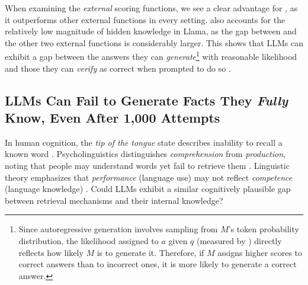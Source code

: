 When examining the \textit{external} scoring functions, we see a clear advantage for \baselineC, as it outperforms other external functions in every setting. \baselineC also accounts for the relatively low magnitude of hidden knowledge in \textsf{Llama}, as the gap between \baselineD and the other two external functions is considerably larger. 
This shows that LLMs can exhibit a gap between the answers they can \emph{generate}\footnote{\label{footnote:generation} Since autoregressive generation involves sampling from $M$'s token probability distribution, the likelihood assigned to $a$ given $q$ (measured by \baselineA) directly reflects how likely $M$ is to generate it. Therefore, if $M$ assigns higher \baselineA scores to correct answers than to incorrect ones, it is more likely to generate a correct answer.} with reasonable likelihood and those they can \emph{verify} as correct when prompted to do so \citep{huang2025selfimprovement,rodriguez2025rankalign}.





\vspace{-5pt}
\subsection{LLMs Can Fail to Generate Facts They \textit{Fully} Know, Even After 1,000 Attempts}
\label{sec:gen_vs_ver}
\vspace{-5pt}

In human cognition, the \textit{tip of the tongue} state describes inability to recall a known word \citep{BROWN1966325}. 
Psycholinguistics distinguishes \textit{comprehension} from \textit{production}, noting that people may understand words yet fail to retrieve them \citep{treiman2003language}. Linguistic theory emphasizes that \textit{performance} (language use) may not reflect \textit{competence} (language knowledge) \citep{aec7bd17-a4c8-3578-b764-35112067fc74}. Could LLMs exhibit a similar cognitively plausible gap between retrieval mechanisms and their internal knowledge?



